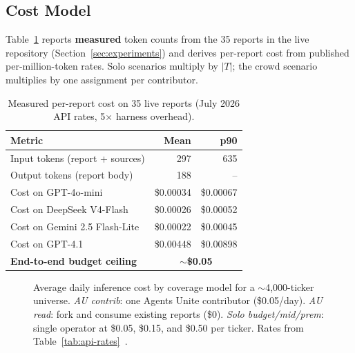 \documentclass[10pt,twocolumn]{article}
\begin{document}
\subsection{Cost Model}

Table~\ref{tab:costmodel} reports \textbf{measured} token counts from the 35 reports in the live repository (Section~\ref{sec:experiments}) and derives per-report cost from published per-million-token rates. Solo scenarios multiply by $|T|$; the crowd scenario multiplies by one assignment per contributor.

\begin{table}[h]
\centering
\caption{Measured per-report cost on 35 live reports (July 2026 API rates, 5$\times$ harness overhead).}
\label{tab:costmodel}
\scriptsize
\begin{tabular}{@{}lrr@{}}
\toprule
\textbf{Metric} & \textbf{Mean} & \textbf{p90} \\
\midrule
Input tokens (report + sources) & 297 & 635 \\
Output tokens (report body) & 188 & -- \\
\midrule
Cost on GPT-4o-mini~\cite{openai-pricing} & \$0.00034 & \$0.00067 \\
Cost on DeepSeek V4-Flash~\cite{deepseek-pricing} & \$0.00026 & \$0.00052 \\
Cost on Gemini 2.5 Flash-Lite~\cite{gemini-pricing} & \$0.00022 & \$0.00045 \\
Cost on GPT-4.1~\cite{openai-pricing} & \$0.00448 & \$0.00898 \\
\midrule
\textbf{End-to-end budget ceiling} & \multicolumn{2}{c}{\textbf{$\sim$\$0.05}} \\
\bottomrule
\end{tabular}
\end{table}

\begin{figure}[h]
\centering
{}
\caption{Average daily inference cost by coverage model for a $\sim$4{,}000-ticker universe. \emph{AU contrib}: one Agents Unite contributor (\$0.05/day). \emph{AU read}: fork and consume existing reports (\$0). \emph{Solo budget/mid/prem}: single operator at \$0.05, \$0.15, and \$0.50 per ticker. Rates from Table~\ref{tab:api-rates}~\cite{openai-pricing,deepseek-pricing,gemini-pricing}.}
\label{fig:costs}
\end{figure}
\end{document}
